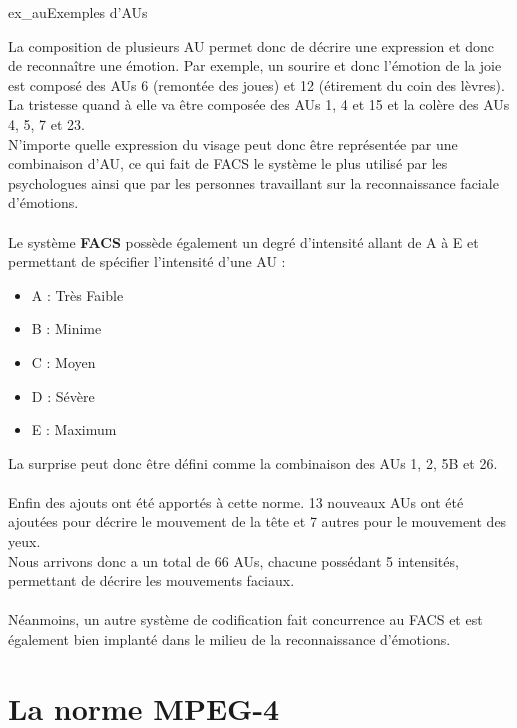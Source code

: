 \documentclass[poster]{polytech/polytech}
\begin{document}
\begin{Figure}{ex_au}{Exemples d'AUs}
\end{Figure}

La composition de plusieurs AU permet donc de décrire une expression et donc de reconnaître une émotion. Par exemple, un sourire et donc l'émotion de la joie est composé des AUs 6 (remontée des joues) et 12 (étirement du coin des lèvres).\\
La tristesse quand à elle va être composée des AUs 1, 4 et 15 et la colère des AUs 4, 5, 7 et 23.\\
N'importe quelle expression du visage peut donc être représentée par une combinaison d'AU, ce qui fait de FACS le système le plus utilisé par les psychologues ainsi que par les personnes travaillant sur la reconnaissance faciale d'émotions.\\
\\
Le système \textbf{FACS} possède également un degré d'intensité allant de A à E et permettant de spécifier l'intensité d'une AU :
\begin{itemize}
	\item A : Très Faible
	\item B : Minime
	\item C : Moyen
	\item D : Sévère
	\item E : Maximum
\end{itemize}
La surprise peut donc être défini comme la combinaison des AUs 1, 2, 5B et 26.\\
\\
Enfin des ajouts ont été apportés à cette norme. 13 nouveaux AUs ont été ajoutées pour décrire le mouvement de la tête et 7 autres pour le mouvement des yeux.\\
Nous arrivons donc a un total de 66 AUs, chacune possédant 5 intensités, permettant de décrire les mouvements faciaux.\\
\\
Néanmoins, un autre système de codification fait concurrence au FACS et est également bien implanté dans le milieu de la reconnaissance d'émotions.

\section{La norme MPEG-4}
\label{sec:fapu}
\end{document}
